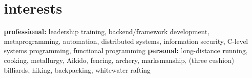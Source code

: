 \documentclass[]{mills-cv} %
\begin{document}

\section{interests}

\textbf{professional:} leadership training, backend/framework development, metaprogramming, automation, distributed systems, information security, C-level systems programming, functional programming \textbf{personal:} long-distance running, cooking, metallurgy, Aikido, fencing, archery, marksmanship, (three cushion) billiards, hiking, backpacking, whitewater rafting
\end{document}
